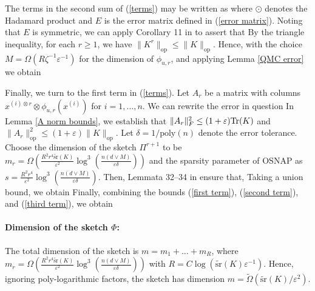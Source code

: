 The terms in the second sum of (\ref{terms}) may be written as
where $\odot$ denotes the Hadamard product and $E$ is the error matrix defined in (\ref{error matrix}). Noting that $E$ is symmetric, we can apply Corollary 11 in \cite{ando1987singular} %
to assert that
By the triangle inequality, for each $r\ge 1$, we have $\|K^r\|_\text{op}\leq \|K\|_\text{op}$. Hence, with the choice $M=\Omega(R \zeta^{-1}\varepsilon^{-1})$ for the dimension of $\phi_{u,r}$, and applying Lemma \ref{QMC error} we obtain

Finally, we turn to the first term in (\ref{terms}). Let $A_r$ be a matrix with columns $x^{(i) \otimes r} \otimes \phi_{u,r}(x^{(i)})$ for $i=1,\dots,n$. We can rewrite the error in question
In Lemma \ref{A norm bounds}, we establish that $\|A_r\|_F^2\leq (1+\varepsilon)\textnormal{Tr}(K)$ and $\|A_r\|^2_\text{op}\leq (1+\varepsilon)\|K\|_\text{op}$. Let $\delta = 1/\text{poly}(n)$ denote the error tolerance.
Choose the dimension of the sketch $\Pi^{r+1}$ to be $m_r = \Omega\left(\frac{R^2 r^4 \tilde{\text{sr}}(K)}{\varepsilon^2}\log^3\left(\frac{n(d\vee M)}{\varepsilon \delta}\right)\right)$ and the sparsity parameter of \textsc{OSNAP} as $s=\frac{R^2 r^4}{\varepsilon^2}\log^3\left(\frac{n(d\vee M)}{\varepsilon \delta}\right)$. Then, Lemmata 32--34 in \cite{ahle2020oblivious} ensure that, 
Taking a union bound, we obtain 
Finally, combining the bounds (\ref{first term}), (\ref{second term}), and (\ref{third term}), we obtain 

\paragraph{Dimension of the sketch $\Phi$:} The total dimension of the sketch is $m=m_1+\dots+m_R$, where $m_r =  \Omega\left(\frac{R^2 r^4 \tilde{\text{sr}}(K)}{\varepsilon^2}\log^3\left(\frac{n(d\vee M)}{\varepsilon \delta}\right)\right)$ with $R = C \log(\tilde{\text{sr}}(K) \varepsilon^{-1})$. Hence, ignoring poly-logarithmic factors, the sketch has dimension $m = \tilde \Omega(\tilde{\text{sr}}(K)/\varepsilon^2)$.

